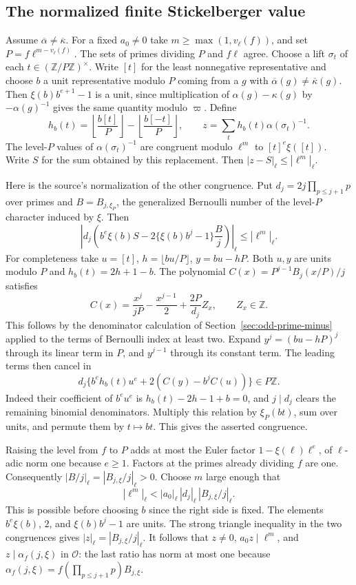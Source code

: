 \subsection{The normalized finite Stickelberger value}

Assume \(\overline\alpha\ne\overline\kappa\). For a fixed \(a_0\ne0\)
take \(m\ge\max(1,v_\ell(f))\), and set
\(P=f\ell^{m-v_\ell(f)}\). The sets of primes dividing \(P\) and
\(f\ell\) agree. Choose a lift \(\sigma_t\) of each
\(t\in(\mathbb Z/P\mathbb Z)^\times\). Write \([t]\) for the least
nonnegative representative and choose \(b\) a unit representative
modulo \(P\) coming from a \(g\) with
\(\overline\alpha(g)\ne\overline\kappa(g)\). Then
\(\xi(b)b^{e+1}-1\) is a unit, since multiplication of
\(\alpha(g)-\kappa(g)\) by \(-\alpha(g)^{-1}\) gives the same
quantity modulo \(\varpi\). Define
\[
 h_b(t)=\left\lfloor\frac{b[t]}P\right\rfloor-
        \left\lfloor\frac{b[-t]}P\right\rfloor,\qquad
 z=\sum_t h_b(t)\alpha(\sigma_t)^{-1}.
\]
The level-\(P\) values of \(\alpha(\sigma_t)^{-1}\) are congruent
modulo \(\ell^m\) to \([t]^e\xi([t])\). Write \(S\) for the sum
obtained by this replacement. Then \(|z-S|_\ell\le|\ell^m|_\ell\).

Here is the source's normalization of the other congruence. Put
\(d_j=2j\prod_{p\le j+1}p\) over primes and
\(B=B_{j,\xi_P}\), the generalized Bernoulli number of the
level-\(P\) character induced by \(\xi\). Then
\[
 \left|d_j\left(b^e\xi(b)S
        -2\{\xi(b)b^j-1\}\frac{B}{j}\right)\right|_\ell
        \le|\ell^m|_\ell .
\]
For completeness take \(u=[t]\), \(h=\lfloor bu/P\rfloor\),
\(y=bu-hP\). Both \(u,y\) are units modulo \(P\) and
\(h_b(t)=2h+1-b\). The polynomial
\(C(x)=P^{j-1}B_j(x/P)/j\) satisfies
\[
       C(x)=\frac{x^j}{jP}-\frac{x^{j-1}}2+
                        \frac{2P}{d_j}Z_x,\qquad Z_x\in\mathbb Z.
\]
This follows by the denominator calculation of
Section~\ref{sec:odd-prime-minus} applied to the terms of Bernoulli
index at least two. Expand \(y^j=(bu-hP)^j\) through its linear
term in \(P\), and \(y^{j-1}\) through its constant term.
The leading terms then cancel in
\[
 d_j\{b^e h_b(t)u^e+2(C(y)-b^j C(u))\}\in P\mathbb Z.
\]
Indeed their coefficient of \(b^e u^e\) is
\(h_b(t)-2h-1+b=0\), and \(j\mid d_j\) clears the remaining
binomial denominators. Multiply this relation by \(\xi_P(bt)\),
sum over units, and permute them by \(t\mapsto bt\). This gives
the asserted congruence.

Raising the level from \(f\) to \(P\) adds at most the Euler factor
\(1-\xi(\ell)\ell^e\), of \(\ell\)-adic norm one because \(e\ge1\).
Factors at the primes already dividing \(f\) are one. Consequently
\(|B/j|_\ell=|B_{j,\xi}/j|_\ell>0\). Choose \(m\) large enough that
\[
 |\ell^m|_\ell
     < |a_0|_\ell\,|d_j|_\ell\,|B_{j,\xi}/j|_\ell .
\]
This is possible before choosing \(b\) since the right side is fixed.
The elements \(b^e\xi(b)\), \(2\), and \(\xi(b)b^j-1\) are units.
The strong triangle inequality in the two congruences gives
\(|z|_\ell=|B_{j,\xi}/j|_\ell\). It follows that \(z\ne0\),
\(a_0z\mid\ell^m\), and \(z\mid\alpha_f(j,\xi)\) in \(\mathcal O\):
the last ratio has norm at most one because
\(\alpha_f(j,\xi)=f(\prod_{p\le j+1}p)B_{j,\xi}\).

